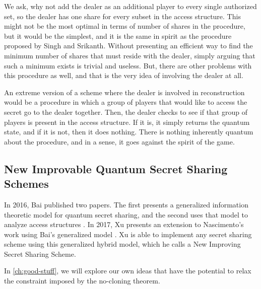 We ask, why not add the dealer as an additional player to every single authorized set, so the dealer has one share for every subset in the access structure. This might not be the most optimal in terms of number of shares in the procedure, but it would be the simplest, and it is the same in spirit as the procedure proposed by Singh and Srikanth. Without presenting an efficient way to find the minimum number of shares that must reside with the dealer, simply arguing that such a minimum exists is trivial and useless. But, there are other problems with this procedure as well, and that is the very idea of involving the dealer at all.

An extreme version of a scheme where the dealer is involved in reconstruction would be a procedure in which a group of players that would like to access the secret go to the dealer together. Then, the dealer checks to see if that group of players is present in the access structure. If it is, it simply returns the quantum state, and if it is not, then it does nothing. There is nothing inherently quantum about the procedure, and in a sense, it goes against the spirit of the game.

\subsection{New Improvable Quantum Secret Sharing Schemes}
\label{ssec:niqss}

In 2016, Bai published two papers. The first presents a generalized information theoretic model for quantum secret sharing, and the second uses that model to analyze access structures \cite{bai_generalized_2016} \cite{bai_quantum_2017}. In 2017, Xu presents an extension to Nascimento's \cite{nascimento_improving_2001} work using Bai's generalized model \cite{xu_new_2017}. Xu is able to implement any secret sharing scheme using this generalized hybrid model, which he calls a New Improving Secret Sharing Scheme. 

In \cref{ch:good-stuff}, we will explore our own ideas that have the potential to relax the constraint imposed by the no-cloning theorem.
